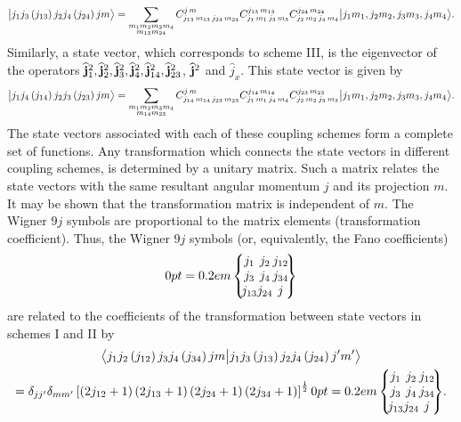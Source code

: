 \begin{equation}
\bigl| j_{1} j_{3}\left(j_{13}\right) j_{2} j_{4}\left(j_{24}\right) j m \bigr\rangle=\sum_{\substack{m_{1} m_{2} m_{3} m_{4} \\ m_{13} m_{24}}} C_{j_{13}\,m_{13}\,j_{24}\,m_{24}}^{j\,m} C_{j_{1}\,m_{1}\,j_{3}\,m_{3}}^{j_{13}\,m_{13}} C_{j_{2}\,m_{2}\,j_{4}\,m_{4}}^{j_{24}\,m_{24}}\bigl| j_{1} m_{1}, j_{2} m_{2}, j_{3} m_{3}, j_{4} m_{4} \bigr\rangle. \label{eq:10:1:3}
\end{equation}
Similarly, a state vector, which corresponds to scheme III, is the eigenvector of the operators $\widehat{\mathbf{j}}_{1}^{2}, \widehat{\mathbf{j}}_{2}^{2}, \widehat{\mathbf{j}}_{3}^{2}, \widehat{\mathbf{j}}_{4}^{2}, \widehat{\mathbf{j}}_{14}^{2}, \widehat{\mathbf{j}}_{23}^{2}$, $\widehat{\mathbf{j}}^{2}$ and $\widehat{j}_{x}$. This state vector is given by
\begin{equation}
\bigl| j_{1} j_{4}\left(j_{14}\right) j_{2} j_{3}\left(j_{23}\right) j m \bigr\rangle=\sum_{\substack{m_{1} m_{2} m_{3} m_{4} \\ m_{14} m_{23}}} C_{j_{14}\,m_{14}\,j_{23}\,m_{23}}^{j\,m} C_{j_{1}\,m_{1}\,j_{4}\,m_{4}}^{j_{14}\,m_{14}} C_{j_{2}\,m_{2}\,j_{3}\,m_{3}}^{j_{23}\,m_{23}}\bigl| j_{1} m_{1}, j_{2} m_{2}, j_{3} m_{3}, j_{4} m_{4} \bigr\rangle. \label{eq:10:1:4}
\end{equation}
The state vectors associated with each of these coupling schemes form a complete set of functions. Any transformation which connects the state vectors in different coupling schemes, is determined by a unitary matrix. Such a matrix relates the state vectors with the same resultant angular momentum $j$ and its projection $m$. It may be shown that the transformation matrix is independent of $m$. The Wigner $9 j$ symbols are proportional to the matrix elements (transformation coefficient). Thus, the Wigner $9 j$ symbols (or, equivalently, the Fano coefficients)
\[
\ninej{j_{1}}{j_{2}}{j_{12}}{j_{3}}{j_{4}}{j_{34}}{j_{13}}{j_{24}}{j}
\]
are related to the coefficients of the transformation between state vectors in schemes I and II by
\begin{multline}
\braket{ j_{1} j_{2}\left(j_{12}\right) j_{3} j_{4}\left(j_{34}\right) j m }{ j_{1} j_{3}\left(j_{13}\right) j_{2} j_{4}\left(j_{24}\right) j^{\prime} m^{\prime}} \\
=\delta_{j j^{\prime}} \delta_{m m^{\prime}}\left[\left(2 j_{12}+1\right)\left(2 j_{13}+1\right)\left(2 j_{24}+1\right)\left(2 j_{34}+1\right)\right]^{\frac{1}{2}}\ninej{j_{1}}{j_{2}}{j_{12}}{j_{3}}{j_{4}}{j_{34}}{j_{13}}{j_{24}}{j}. \label{eq:10:1:5}
\end{multline}
